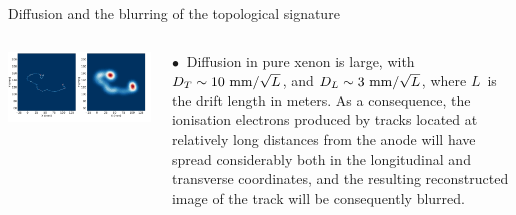 \documentclass [aspectratio=169]{beamer}
\begin{document}
\begin{frame}{Diffusion and the blurring of the topological signature}
\begin{columns}
\includegraphics[scale=0.27]{diffusion.png}


$\bullet~$ Diffusion in pure xenon is large, with $D_T \sim {\rm 10~mm}/\sqrt{L}$, and
$D_L \sim {\rm 3~mm}/\sqrt{L}$, where $L$~is the drift length in meters. As a consequence, the ionisation electrons produced by tracks located at relatively long distances from the anode will have spread considerably both in the longitudinal and transverse coordinates, and the resulting reconstructed image of the track will be consequently blurred. 

 \end{columns}
\end{frame}
\end{document}
